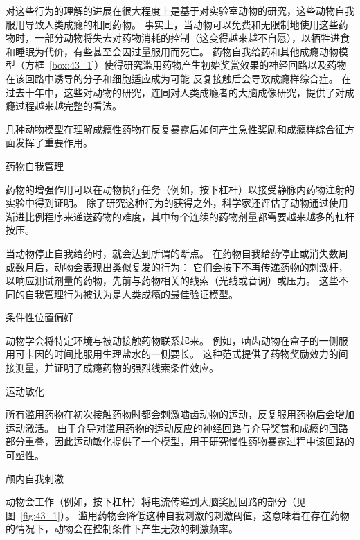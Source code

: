 对这些行为的理解的进展在很大程度上是基于对实验室动物的研究，这些动物自我服用导致人类成瘾的相同药物。
事实上，当动物可以免费和无限制地使用这些药物时，一部分动物将失去对药物消耗的控制（这变得越来越不自愿），以牺牲进食和睡眠为代价，有些甚至会因过量服用而死亡。
药物自我给药和其他成瘾动物模型（方框~\ref{box:43_1}）使得研究滥用药物产生初始奖赏效果的神经回路以及药物在该回路中诱导的分子和细胞适应成为可能 反复接触后会导致成瘾样综合症。
在过去十年中，这些对动物的研究，连同对人类成瘾者的大脑成像研究，提供了对成瘾过程越来越完整的看法。


\begin{proposition}[药物成瘾的动物模型] \label{box:43_1}
	
	\quad \quad 几种动物模型在理解成瘾性药物在反复暴露后如何产生急性奖励和成瘾样综合征方面发挥了重要作用。
	
	\quad \quad 药物自我管理
	
	\quad \quad 药物的增强作用可以在动物执行任务（例如，按下杠杆）以接受静脉内药物注射的实验中得到证明。
	除了研究这种行为的获得之外，科学家还评估了动物通过使用渐进比例程序来递送药物的难度，其中每个连续的药物剂量都需要越来越多的杠杆按压。
	
	\quad \quad 当动物停止自我给药时，就会达到所谓的断点。
	在药物自我给药停止或消失数周或数月后，动物会表现出类似复发的行为：
	它们会按下不再传递药物的刺激杆，以响应测试剂量的药物，先前与药物相关的线索（光线或音调）或压力。
	这些不同的自我管理行为被认为是人类成瘾的最佳验证模型。
	
	\quad \quad 条件性位置偏好
	
	\quad \quad 动物学会将特定环境与被动接触药物联系起来。
	例如，啮齿动物在盒子的一侧服用可卡因的时间比服用生理盐水的一侧要长。
	这种范式提供了药物奖励效力的间接测量，并证明了成瘾药物的强烈线索条件效应。
	
	\quad \quad 运动敏化
	
	\quad \quad 所有滥用药物在初次接触药物时都会刺激啮齿动物的运动，反复服用药物后会增加运动激活。
	由于介导对滥用药物的运动反应的神经回路与介导奖赏和成瘾的回路部分重叠，因此运动敏化提供了一个模型，用于研究慢性药物暴露过程中该回路的可塑性。
	
	\quad \quad 颅内自我刺激
	
	\quad \quad 动物会工作（例如，按下杠杆）将电流传递到大脑奖励回路的部分（见图~\ref{fig:43_1}）。
	滥用药物会降低这种自我刺激的刺激阈值，这意味着在存在药物的情况下，动物会在控制条件下产生无效的刺激频率。
	
\end{proposition}



